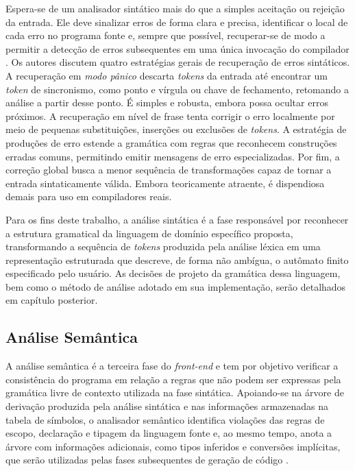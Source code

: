 \documentclass[
    12pt
    ,oneside
    ,a4paper
    ,chapter=TITLE
    ,section=TITLE
    ,sumario=abnt-6027-2012]{abntex2}
\begin{document}
Espera-se de um analisador sintático mais do que a simples aceitação ou rejeição da entrada.
Ele deve sinalizar erros de forma clara e precisa, identificar o local de cada erro no programa
fonte e, sempre que possível, recuperar-se de modo a permitir a detecção de erros subsequentes
em uma única invocação do compilador \cite{aho2008}. Os autores discutem quatro
estratégias gerais de recuperação de erros sintáticos. A recuperação em \textit{modo pânico}
descarta \textit{tokens} da entrada até encontrar um \textit{token} de sincronismo, como
ponto e vírgula ou chave de fechamento, retomando a análise a partir desse ponto. É simples e
robusta, embora possa ocultar erros próximos. A recuperação em nível de frase tenta corrigir o
erro localmente por meio de pequenas substituições, inserções ou exclusões de \textit{tokens}.
A estratégia de produções de erro estende a gramática com regras que reconhecem construções
erradas comuns, permitindo emitir mensagens de erro especializadas. Por fim, a correção global
busca a menor sequência de transformações capaz de tornar a entrada sintaticamente válida.
Embora teoricamente atraente, é dispendiosa demais para uso em compiladores reais.

Para os fins deste trabalho, a análise sintática é a fase responsável por reconhecer a
estrutura gramatical da linguagem de domínio específico proposta, transformando a sequência de
\textit{tokens} produzida pela análise léxica em uma representação estruturada que descreve, de
forma não ambígua, o autômato finito especificado pelo usuário. As decisões de projeto da
gramática dessa linguagem, bem como o método de análise adotado em sua implementação, serão
detalhados em capítulo posterior.

\subsection{Análise Semântica}
\label{sec:semantica}
A análise semântica é a terceira fase do \textit{front-end} e tem por objetivo verificar a
consistência do programa em relação a regras que não podem ser expressas pela gramática livre de
contexto utilizada na fase sintática. Apoiando-se na árvore de derivação produzida pela análise
sintática e nas informações armazenadas na tabela de símbolos, o analisador semântico identifica
violações das regras de escopo, declaração e tipagem da linguagem fonte e, ao mesmo tempo,
anota a árvore com informações adicionais, como tipos inferidos e conversões implícitas, que
serão utilizadas pelas fases subsequentes de geração de código \cite{aho2008}.
\end{document}

